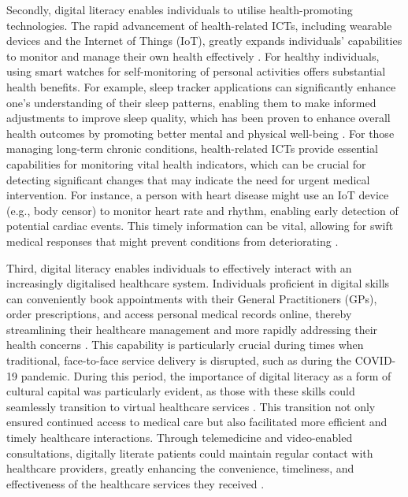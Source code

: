 Secondly, digital literacy enables individuals to utilise health-promoting technologies. The rapid advancement of health-related ICTs, including wearable devices and the Internet of Things (IoT), greatly expands individuals' capabilities to monitor and manage their own health effectively \parencite{schulz_advancing_2015}. For healthy individuals, using smart watches for self-monitoring of personal activities offers substantial health benefits. For example, sleep tracker applications can significantly enhance one's understanding of their sleep patterns, enabling them to make informed adjustments to improve sleep quality, which has been proven to enhance overall health outcomes by promoting better mental and physical well-being \parencite{reeder_health_2016}. For those managing long-term chronic conditions, health-related ICTs provide essential capabilities for monitoring vital health indicators, which can be crucial for detecting significant changes that may indicate the need for urgent medical intervention. For instance, a person with heart disease might use an IoT device (e.g., body censor) to monitor heart rate and rhythm, enabling early detection of potential cardiac events. This timely information can be vital, allowing for swift medical responses that might prevent conditions from deteriorating \parencite{domingo_overview_2012}.

Third, digital literacy enables individuals to effectively interact with an increasingly digitalised healthcare system. Individuals proficient in digital skills can conveniently book appointments with their General Practitioners (GPs), order prescriptions, and access personal medical records online, thereby streamlining their healthcare management and more rapidly addressing their health concerns \parencite{makri_bridging_2019}. This capability is particularly crucial during times when traditional, face-to-face service delivery is disrupted, such as during the COVID-19 pandemic. During this period, the importance of digital literacy as a form of cultural capital was particularly evident, as those with these skills could seamlessly transition to virtual healthcare services \parencite{eyrich_bridging_2021}. This transition not only ensured continued access to medical care but also facilitated more efficient and timely healthcare interactions. Through telemedicine and video-enabled consultations, digitally literate patients could maintain regular contact with healthcare providers, greatly enhancing the convenience, timeliness, and effectiveness of the healthcare services they received \parencite{crawford_digital_2020}.


